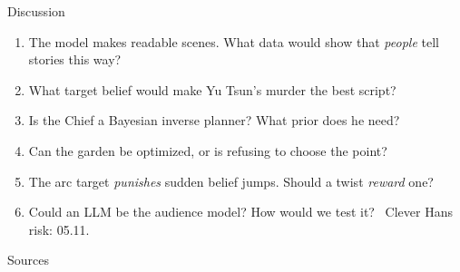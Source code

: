 \documentclass[aspectratio=169,10pt]{beamer}
\newcommand{\seminar}[1]{{\scriptsize\color{gray}\faLink\ #1}}
\newcommand{\tightitem}{\itemsep0.3em}
\begin{document}
\begin{frame}{Discussion}
\begin{enumerate}\tightitem
  \item The model makes readable scenes. What data would show that \emph{people} tell stories this way?
  \item What target belief would make Yu Tsun's murder the best script?
  \item Is the Chief a Bayesian inverse planner? What prior does he need?
  \item Can the garden be optimized, or is refusing to choose the point?
  \item The arc target \emph{punishes} sudden belief jumps. Should a twist \emph{reward} one?
  \item Could an LLM be the audience model? How would we test it? \seminar{Clever Hans risk: 05.11.}
\end{enumerate}
\end{frame}

\appendix
\begin{frame}[allowframebreaks]{Sources}
\scriptsize
\nocite{*}


\end{frame}
\end{document}
